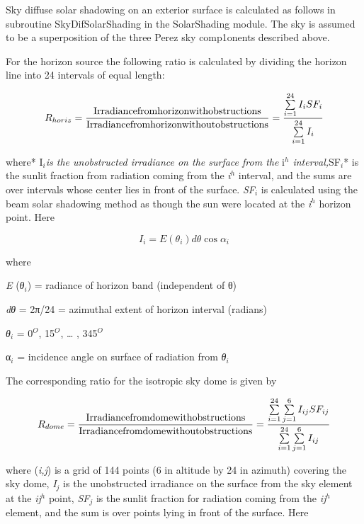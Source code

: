 Sky diffuse solar shadowing on an exterior surface is calculated as follows in subroutine SkyDifSolarShading in the SolarShading module. The sky is assumed to be a superposition of the three Perez sky comp1onents described above.

For the horizon source the following ratio is calculated by dividing the horizon line into 24 intervals of equal length:

\begin{equation}
{R_{horiz}} = \frac{{{\rm{Irradiance from horizon with obstructions}}}}{{{\rm{Irradiance from horizon without obstructions}}}} = \frac{{\sum\limits_{i = 1}^{24} {{I_i}S{F_i}} }}{{\sum\limits_{i = 1}^{24} {{I_i}} }}
\end{equation}

where* I\(_{i}\)\emph{is the unobstructed irradiance on the surface from the} i\emph{\(^{h}\) interval,}SF\(_{i}\)* is the sunlit fraction from radiation coming from the \emph{i}\(^{h}\) interval, and the sums are over intervals whose center lies in front of the surface. \emph{SF\(_{i}\)} is calculated using the beam solar shadowing method as though the sun were located at the \emph{i}\(^{h}\) horizon point. Here

\begin{equation}
{I_i} = E({\theta_i})d\theta \cos {\alpha_i}
\end{equation}

where

\emph{E} (\emph{θ\(_{i}\)}) = radiance of horizon band (independent of θ)

\emph{dθ} = 2π/24 = azimuthal extent of horizon interval (radians)

\emph{θ\(_{i}\)} = 0\(^{O}\), 15\(^{O}\), \ldots{} , 345\(^{O}\)

α\(_{i}\) = incidence angle on surface of radiation from \emph{θ\(_{i}\)}

The corresponding ratio for the isotropic sky dome is given by

\begin{equation}
{R_{dome}} = \frac{{{\rm{Irradiance from dome with obstructions}}}}{{{\rm{Irradiance from dome without obstructions}}}} = \frac{{\sum\limits_{i = 1}^{24} {\sum\limits_{j = 1}^6 {{I_{ij}}S{F_{ij}}} } }}{{\sum\limits_{i = 1}^{24} {\sum\limits_{j = 1}^6 {{I_{ij}}} } }}
\end{equation}

where (\emph{i,j}) is a grid of 144 points (6 in altitude by 24 in azimuth) covering the sky dome, \emph{I\(_{j}\)} is the unobstructed irradiance on the surface from the sky element at the \emph{ij}\(^{h}\) point, \emph{SF\(_{j}\)} is the sunlit fraction for radiation coming from the \emph{ij}\(^{h}\) element, and the sum is over points lying in front of the surface. Here

